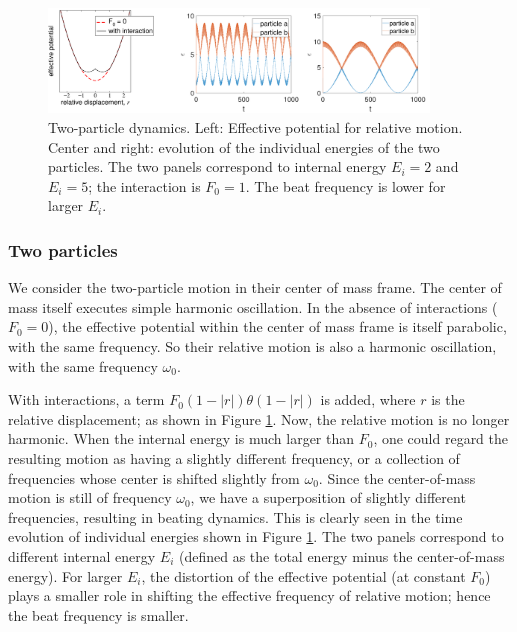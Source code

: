 \documentclass[onecolumn,pra]{revtex4-1}
\begin{document}
\begin{figure}[tbph]
\centering
\includegraphics[width=0.9\textwidth]{ZhiyuPictures/two_particles_a_01.pdf}
\caption{Two-particle dynamics.  Left: Effective potential for relative motion.  Center and right:
  evolution of the individual energies of the two particles.  The two panels correspond to internal
  energy $E_i=2$ and $E_i=5$; the interaction is $F_0=1$.  The beat frequency is lower for larger
  $E_i$. }
\label{fig:thermalization2}
\end{figure}


\subsubsection{Two particles}

We consider the two-particle motion in their center of mass frame.  The center of mass itself
executes simple harmonic oscillation.  In the absence of interactions ($F_0=0$), the effective
potential within the center of mass frame is itself parabolic, with the same frequency.  So their
relative motion is also a harmonic oscillation, with the same frequency $\omega_0$.

With interactions, a term $F_0(1-|r|)\theta(1-|r|)$ is added, where $r$ is the relative
displacement; as shown in Figure \ref{fig:thermalization2}.  Now, the relative motion is no longer
harmonic.  When the internal energy is much larger than $F_0$, one could regard the resulting motion
as having a slightly different frequency, or a collection of frequencies whose center is shifted
slightly from $\omega_0$.  Since the center-of-mass motion is still of frequency $\omega_0$, we have
a superposition of slightly different frequencies, resulting in beating dynamics.  This is clearly
seen in the time evolution of individual energies shown in Figure \ref{fig:thermalization2}.  The
two panels correspond to different internal energy $E_i$ (defined as the total energy minus the
center-of-mass energy).  For larger $E_i$, the distortion of the effective potential (at constant
$F_0$) plays a smaller role in shifting the effective frequency of relative motion; hence the beat
frequency is smaller.
\end{document}
